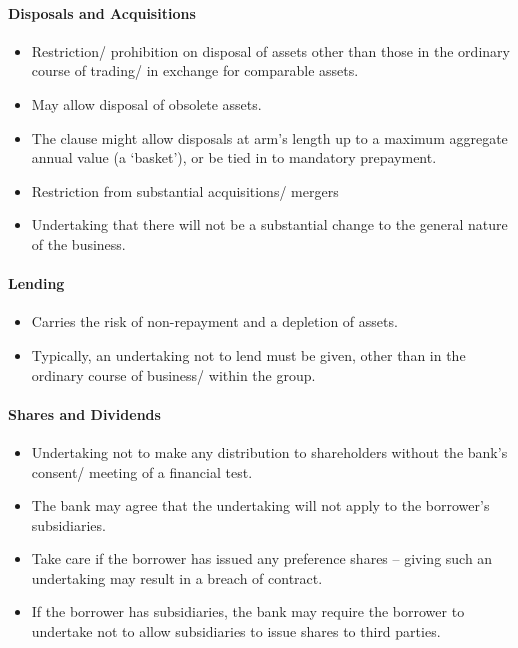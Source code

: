 \documentclass[
]{article}
\providecommand{\tightlist}{%
  \setlength{\itemsep}{0pt}\setlength{\parskip}{0pt}}
\begin{document}
\hypertarget{disposals-and-acquisitions}{%
\paragraph{Disposals and
Acquisitions}\label{disposals-and-acquisitions}}

\begin{itemize}
\tightlist
\item
  Restriction/ prohibition on disposal of assets other than those in the
  ordinary course of trading/ in exchange for comparable assets.
\item
  May allow disposal of obsolete assets.
\item
  The clause might allow disposals at arm's length up to a maximum
  aggregate annual value (a `basket'), or be tied in to mandatory
  prepayment.
\item
  Restriction from substantial acquisitions/ mergers
\item
  Undertaking that there will not be a substantial change to the general
  nature of the business.
\end{itemize}

\hypertarget{lending}{%
\paragraph{Lending}\label{lending}}

\begin{itemize}
\tightlist
\item
  Carries the risk of non-repayment and a depletion of assets.
\item
  Typically, an undertaking not to lend must be given, other than in the
  ordinary course of business/ within the group.
\end{itemize}

\hypertarget{shares-and-dividends}{%
\paragraph{Shares and Dividends}\label{shares-and-dividends}}

\begin{itemize}
\tightlist
\item
  Undertaking not to make any distribution to shareholders without the
  bank's consent/ meeting of a financial test.
\item
  The bank may agree that the undertaking will not apply to the
  borrower's subsidiaries.
\item
  Take care if the borrower has issued any preference shares -- giving
  such an undertaking may result in a breach of contract.
\item
  If the borrower has subsidiaries, the bank may require the borrower to
  undertake not to allow subsidiaries to issue shares to third parties.
\end{itemize}
\end{document}

